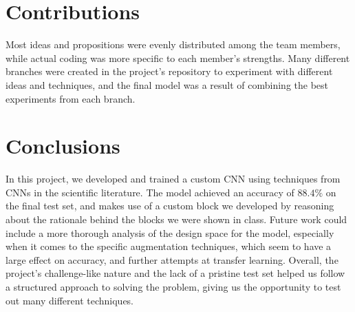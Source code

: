 \documentclass[11pt]{article}
\begin{document}
\begin{multicols}{2}
      \section{Contributions}

      Most ideas and propositions were evenly distributed among the team members, while actual coding was more specific to each member's strengths. Many different branches were created in the project's repository to experiment with different ideas and techniques, and the final model was a result of combining the best experiments from each branch.

      \section{Conclusions}

      In this project, we developed and trained a custom CNN using techniques from CNNs in the scientific literature. The model achieved an accuracy of $88.4\%$ on the final test set, and makes use of a custom block we developed by reasoning about the rationale behind the blocks we were shown in class. Future work could include a more thorough analysis of the design space for the model, especially when it comes to the specific augmentation techniques, which seem to have a large effect on accuracy, and further attempts at transfer learning. Overall, the project's challenge-like nature and the lack of a pristine test set helped us follow a structured approach to solving the problem, giving us the opportunity to test out many different techniques.

      
      

\end{multicols}
\end{document}
